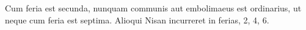 Cum feria est secunda, nunquam
communis aut embolimaeus est ordinarius, ut neque cum feria
est septima.
Alioqui Nisan incurreret in ferias, 2, 4, 6.

































